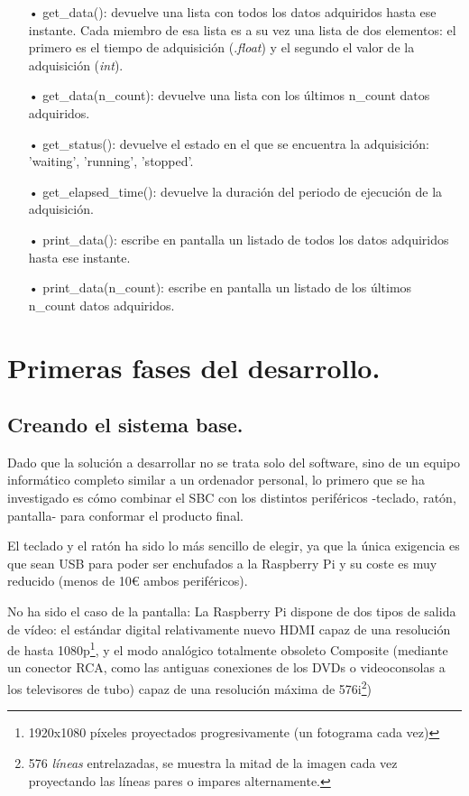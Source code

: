\begin{itemize}
		\item[•] get\_data(): devuelve una lista con todos los datos adquiridos hasta ese instante. Cada miembro de esa lista es a su vez una lista de dos elementos: el primero es el tiempo de adquisición (.\emph{float}) y el segundo el valor de la adquisición (\emph{int}).
		\item[•] get\_data(n\_count): devuelve una lista con los últimos n\_count datos adquiridos.
		\item[•] get\_status(): devuelve el estado en el que se encuentra la adquisición: ’waiting’, ’running’, ’stopped’.
		\item[•] get\_elapsed\_time(): devuelve la duración del periodo de ejecución de la adquisición.
		\item[•] print\_data(): escribe en pantalla un listado de todos los datos adquiridos hasta ese instante. 
		\item[•] print\_data(n\_count): escribe en pantalla un listado de los últimos n\_count datos adquiridos.
	\end{itemize}

\section{Primeras fases del desarrollo.}	
\subsection{Creando el sistema base.}
	Dado que la solución a desarrollar no se trata solo del software, sino de un equipo informático completo similar a un ordenador personal, lo primero que se ha investigado es cómo combinar el SBC con los distintos periféricos -teclado, ratón, pantalla- para conformar el producto final.
	
	El teclado y el ratón ha sido lo más sencillo de elegir, ya que la única exigencia es que sean USB para poder ser enchufados a la Raspberry Pi y su coste es muy reducido (menos de 10€ ambos periféricos).
	
	No ha sido el caso de la pantalla: La Raspberry Pi dispone de dos tipos de salida de vídeo: el estándar digital relativamente nuevo HDMI capaz de una resolución de hasta 1080p\footnote{1920x1080 píxeles proyectados progresivamente (un fotograma cada vez)}, y el modo analógico totalmente obsoleto Composite (mediante un conector RCA, como las antiguas conexiones de los DVDs o videoconsolas a los televisores de tubo) capaz de una resolución máxima de 576i\footnote{576 \emph{líneas} entrelazadas, se muestra la mitad de la imagen cada vez proyectando las líneas pares o impares alternamente.}) 
	
